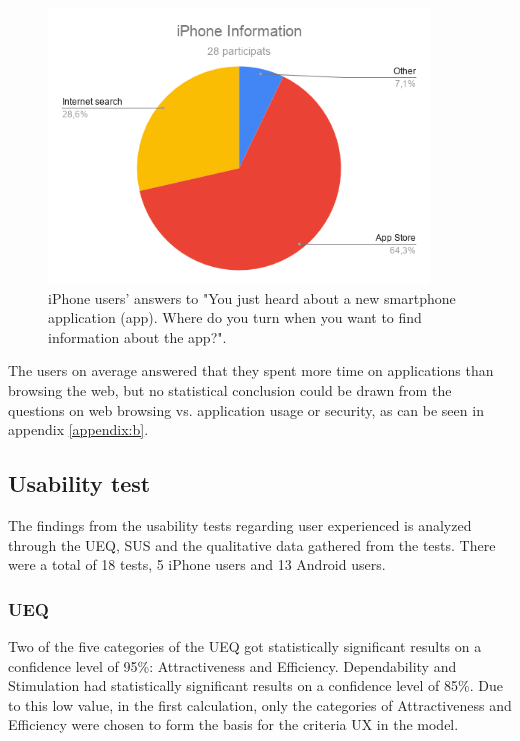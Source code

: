 \begin{figure}[ht]
    \centering 
    \includegraphics[width=0.9\textwidth]{img/iPhone_Information.png}
    \hfill
    \caption{\label{fig:iphone-info}{iPhone users' answers to "You just heard about a new smartphone application (app). Where do you turn when you want to find information about the app?".}}
\end{figure}

 The users on average answered that they spent more time on applications than browsing the web, but no statistical conclusion could be drawn from the questions on web browsing vs. application usage or security, as can be seen in appendix \ref{appendix:b}.
 
\subsection{Usability test}
The findings from the usability tests regarding user experienced is analyzed through the UEQ, SUS and the qualitative data gathered from the tests. There were a total of 18 tests, 5 iPhone users and 13 Android users.

\subsubsection{UEQ}

Two of the five categories of the UEQ got statistically significant results on a confidence level of 95\%: Attractiveness and Efficiency. Dependability and Stimulation had statistically significant results on a confidence level of 85\%. Due to this low value, in the first calculation, only the categories of Attractiveness and Efficiency were chosen to form the basis for the criteria UX in the model.

